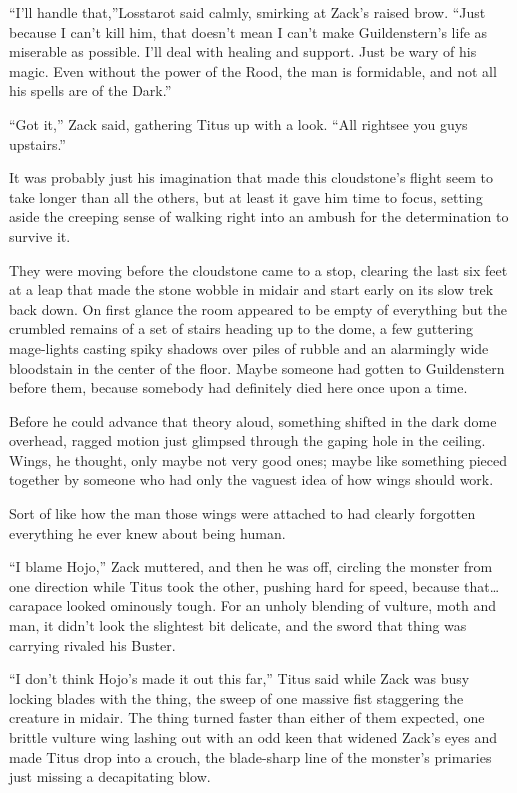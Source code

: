 ``I'll handle that,''Losstarot said calmly, smirking at Zack's raised brow. ``Just because I can't kill him, that doesn't mean I can't make Guildenstern's life as miserable as possible. I'll deal with healing and support. Just be wary of his magic. Even without the power of the Rood, the man is formidable, and not all his spells are of the Dark.''

``Got it,'' Zack said, gathering Titus up with a look. ``All right\textemdash see you guys upstairs.''

It was probably just his imagination that made this cloudstone's flight seem to take longer than all the others, but at least it gave him time to focus, setting aside the creeping sense of walking right into an ambush for the determination to survive it.

They were moving before the cloudstone came to a stop, clearing the last six feet at a leap that made the stone wobble in midair and start early on its slow trek back down. On first glance the room appeared to be empty of everything but the crumbled remains of a set of stairs heading up to the dome, a few guttering mage-lights casting spiky shadows over piles of rubble and an alarmingly wide bloodstain in the center of the floor. Maybe someone had gotten to Guildenstern before them, because somebody had definitely died here once upon a time.

Before he could advance that theory aloud, something shifted in the dark dome overhead, ragged motion just glimpsed through the gaping hole in the ceiling. Wings, he thought, only maybe not very good ones; maybe like something pieced together by someone who had only the vaguest idea of how wings should work.

Sort of like how the man those wings were attached to had clearly forgotten everything he ever knew about being human.

``I blame Hojo,'' Zack muttered, and then he was off, circling the monster from one direction while Titus took the other, pushing hard for speed, because that\ldots carapace looked ominously tough. For an unholy blending of vulture, moth and man, it didn't look the slightest bit delicate, and the sword that thing was carrying rivaled his Buster.

``I don't think Hojo's made it out this far,'' Titus said while Zack was busy locking blades with the thing, the sweep of one massive fist staggering the creature in midair. The thing turned faster than either of them expected, one brittle vulture wing lashing out with an odd keen that widened Zack's eyes and made Titus drop into a crouch, the blade-sharp line of the monster's primaries just missing a decapitating blow.

